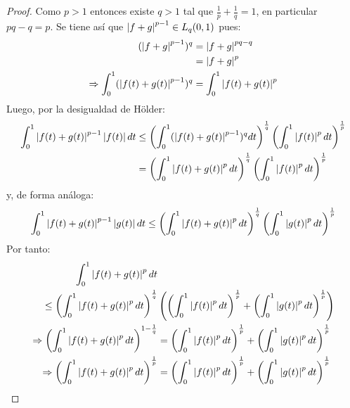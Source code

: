\documentclass[twoside,12pt,a4 paper,openright]{book}
\begin{document}
\begin{enumerate}
\begin{proof}
        Como $p>1$ entonces existe $q>1$ tal que $\frac{1}{p}+\frac{1}{q}=1$, en particular $pq-q=p$. Se tiene as\'i que $\left|f+g\right|^{p-1}\in L_{q}(0,1)$ pues:
        \begin{equation*}
            \begin{split}
                (\left|f+g\right|^{p-1})^q&=\left|f+g\right|^{pq-q}\\
                &=\left|f+g\right|^p\\
                \Rightarrow \int_{0}^{1}(\left|f(t)+g(t)\right|^{p-1})^q&=\int_{0}^{1}\left|f(t)+g(t)\right|^p
            \end{split}
        \end{equation*}
        Luego, por la desigualdad de H\"older:
        \begin{equation*}
            \begin{split}
                \int_{0}^{1}\left|f(t)+g(t)\right|^{p-1}\left|f(t)\right|dt&\leq\left(\int_{0}^{1}(\left|f(t)+g(t)\right|^{p-1})^qdt\right)^{\frac{1}{q}}\left(\int_{0}^{1}\left|f(t)\right|^p dt\right)^{\frac{1}{p}}\\
                &=\left(\int_{0}^{1}\left|f(t)+g(t)\right|^pdt \right)^{\frac{1}{q}}\left(\int_{0}^{1}\left|f(t)\right|^p dt\right)^{\frac{1}{p}}\\
            \end{split}
        \end{equation*}
        y, de forma an\'aloga:
        \begin{equation*}
            \begin{split}
                \int_{0}^{1}\left|f(t)+g(t)\right|^{p-1}\left|g(t)\right|dt&\leq\left(\int_{0}^{1}\left|f(t)+g(t)\right|^pdt \right)^{\frac{1}{q}}\left(\int_{0}^{1}\left|g(t)\right|^p dt\right)^{\frac{1}{p}}\\
            \end{split}
        \end{equation*}
        Por tanto:
        \begin{equation*}
            \begin{split}
                \int_{0}^{1}\left|f(t)+g(t)\right|^pdt&\\
                \leq\left(\int_{0}^{1}\left|f(t)+g(t)\right|^pdt \right)^{\frac{1}{q}}&\left(\left(\int_{0}^{1}\left|f(t)\right|^p dt\right)^{\frac{1}{p}}+\left(\int_{0}^{1}\left|g(t)\right|^p dt\right)^{\frac{1}{p}}\right)\\
                \Rightarrow \left(\int_{0}^{1}\left|f(t)+g(t)\right|^pdt\right)^{1-\frac{1}{q}}&=\left(\int_{0}^{1}\left|f(t)\right|^p dt\right)^{\frac{1}{p}}+\left(\int_{0}^{1}\left|g(t)\right|^p dt\right)^{\frac{1}{p}}\\
                \Rightarrow \left(\int_{0}^{1}\left|f(t)+g(t)\right|^pdt\right)^{\frac{1}{p}}&=\left(\int_{0}^{1}\left|f(t)\right|^p dt\right)^{\frac{1}{p}}+\left(\int_{0}^{1}\left|g(t)\right|^p dt\right)^{\frac{1}{p}}\\
            \end{split}
        \end{equation*}
    \end{proof}


\end{enumerate}
\end{document}
